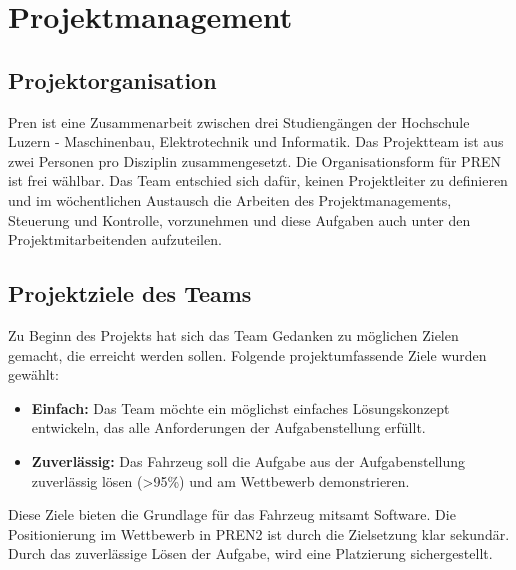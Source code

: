 \documentclass[../main.tex]{subfiles}
\begin{document}
\newpage
\section{Projektmanagement}

\subsection {Projektorganisation}
Pren ist eine Zusammenarbeit zwischen drei Studiengängen der Hochschule Luzern - Maschinenbau, Elektrotechnik und Informatik. Das Projektteam ist aus zwei Personen pro Disziplin zusammengesetzt. Die Organisationsform für PREN ist frei wählbar. Das Team entschied sich dafür, keinen Projektleiter zu definieren und im wöchentlichen Austausch die Arbeiten des Projektmanagements, Steuerung und Kontrolle, vorzunehmen und diese Aufgaben auch unter den Projektmitarbeitenden aufzuteilen.

\subsection{Projektziele des Teams}
Zu Beginn des Projekts hat sich das Team Gedanken zu möglichen Zielen gemacht, die erreicht werden sollen. Folgende projektumfassende Ziele wurden gewählt:
\begin{itemize}
\item \textbf{Einfach:} Das Team möchte ein möglichst einfaches Lösungskonzept entwickeln, das alle Anforderungen der Aufgabenstellung erfüllt.
\item \textbf{Zuverlässig:} Das Fahrzeug soll die Aufgabe aus der Aufgabenstellung zuverlässig lösen (>95\%) und am Wettbewerb demonstrieren.
\end{itemize}

Diese Ziele bieten die Grundlage für das Fahrzeug mitsamt Software.
Die Positionierung im Wettbewerb in PREN2 ist durch die Zielsetzung klar sekundär. Durch das zuverlässige Lösen der Aufgabe, wird eine Platzierung sichergestellt.
\end{document}

